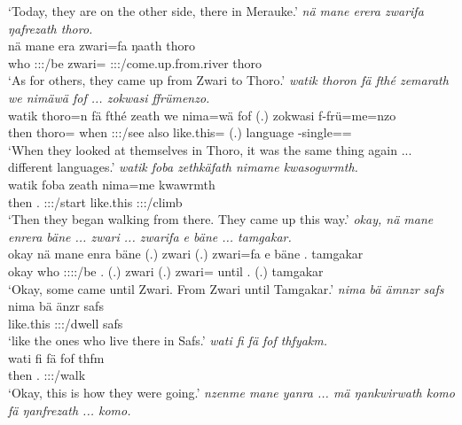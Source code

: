 \begin{exe}
	\trans `Today, they are on the other side, there in Merauke.'
	\emph{nä mane erera zwarifa ŋafrezath thoro.}\\
	\gll nä mane era zwari=fa ŋaath thoro\\ 
	{\Indf} who \Stpl:\Sbj:\Pst:\Ipfv/be zwari={\Abl} \Stpl:\Sbj:\Pst:\Ipfv/come.up.from.river thoro\\
	\trans `As for others, they came up from Zwari to Thoro.'
	\emph{watik thoron fä fthé zemarath we nimäwä fof ... zokwasi ffrümenzo.}\\
	\gll watik thoro=n fä fthé zeath we nima=wä fof (.) zokwasi f-frü=me=nzo\\ 
	then thoro={\Loc} {\Dist} when \Stpl:\Sbj:\Pst:\Ipfv/see also like.this={\Emph} {\Emph} (.) language \Redup-single=\Ins=\Only\\
	\trans `When they looked at themselves in Thoro, it was the same thing again ... different languages.'
	\emph{watik foba zethkäfath nimame kwasogwrmth.}\\
	\gll watik foba zeath nima=me kwawrmth\\ 
	then \Dist.{\Abl} \Stpl:\Sbj:\Pst:\Ipfv/start like.this \Stpl:\Sbj:\Pst:\Dur/climb\\
	\trans `Then they began walking from there. They came up this way.'
	\emph{okay, nä mane enrera bäne ... zwari ... zwarifa e bäne ... tamgakar.}\\
	\gll okay nä mane enra bäne (.) zwari (.) zwari=fa e bäne . tamgakar\\ 
	okay {\Indf} who \Stpl:\Sbj:\Pst:\Ipfv:\Venit/be \Recog.{\Abs} (.) zwari (.) zwari={\Abl} until \Recog.{\Abs} (.) tamgakar\\
	\trans `Okay, some came until Zwari. From Zwari until Tamgakar.'
	\emph{nima bä ämnzr safs}\\
	\gll nima bä änzr safs\\ 
	like.this \Med{} \Stpl:\Sbj:\Nonpast:\Ipfv/dwell safs\\
	\trans `like the ones who live there in Safs.'
	\emph{wati fi fä fof thfyakm.}\\
	\gll wati fi fä fof thfm\\ 
	then \Third.{\Abs} {\Dist} {\Emph} \Stpl:\Sbj:\Pst:\Dur/walk\\
	\trans `Okay, this is how they were going.'
\newpage 
{} 
	\emph{nzenme mane yanra ... mä ŋankwirwath komo fä ŋanfrezath ... komo.}\\

\end{exe}
